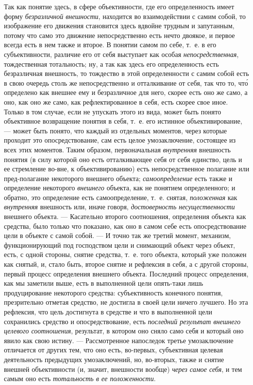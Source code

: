 \documentclass[twoside]{article}
\begin{document}
{{{{Так как понятие здесь, в сфере объективности, где его
определенность имеет форму
{\em безразличной внешности},
находится во взаимодействии с самим собой, то изображение его
движения становится здесь вдвойне трудным и запутанным, потому что само это
движение непосредственно есть нечто двоякое, и первое всегда есть в нем
также и второе. В понятии самом по себе, т.~е. в его субъективности,
различие его от себя выступает как особая
{\em непосредственная},
тождественная тотальность; ну, а так как здесь его
определенность есть безразличная внешность, то тождество в этой
определенности с самим собой есть в свою очередь столь же непосредственно и
отталкивание от себя, так что то, что́ определено как внешнее ему и
безразличное для него, скорее есть оно же само, а оно, как оно же само, как
рефлектированное в себя, есть скорее свое иное. Только в том случае, если
не упускать этого из вида, может быть понято объективное возвращение
понятия в себя, т.~е. его истинное объективирование, — может
быть понято, что каждый из отдельных моментов, через которые проходит это
опосредствование, сам есть целое умозаключение, состоящее из всех этих
моментов. Таким образом, первоначальная
{\em внутренняя}
внешность понятия (в силу которой оно есть отталкивающее себя
от себя единство, цель и ее стремление во-вне, к объективированию) есть
непосредственное полагание или пред-полагание некоторого внешнего объекта;
{\em самоопределение}
есть также и определение некоторого
{\em внешнего} объекта,
как не понятием определенного; и обратно, это определение есть
самоопределение, т.~е. снятая,
{\em положенная} как
{\em внутренняя}
внешность или, иначе говоря,
{\em достоверность несущественности}
внешнего объекта. — Касательно второго
соотношения, определения объекта как средства, было только что показано,
как оно в самом себе есть опосредствование цели в объекте с самой собой. —
И точно так же третий момент, механизм, функционирующий под
господством цели и снимающий объект через объект, есть, с одной стороны,
снятие средства, т.~е. того объекта, который уже положен как снятый, и,
стало быть, второе снятие и рефлексия в себя, а с другой стороны, первый
процесс определения внешнего объекта. Последний процесс определения, как мы
заметили выше, есть в выполненной цели опять-таки лишь
продуцирование некоторого средства: субъективность конечного понятия,
презрительно отметая средство, не достигла в своей цели ничего лучшего. Но
эта рефлексия, что цель достигнута в средстве и что в выполненной цели
сохранились средство и опосредствование, есть
{\em последний результат внешнего
целевого соотношения}, результат, в котором оно сняло само
себя и который оно явило как свою истину. — Рассмотренное
напоследок третье умозаключение отличается от других тем, что оно есть,
во-первых, субъективная целевая деятельность предыдущих умозаключений, но,
во-вторых, также и снятие внешней объективности (и, значит, внешности
вообще) {\em через самое себя},
и тем самым оно есть
{\em тотальность в ее положенности}.

}}}}
\end{document}
